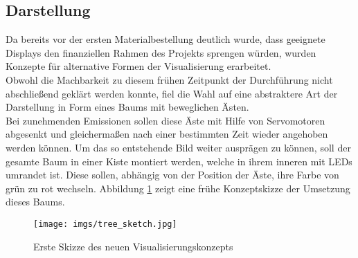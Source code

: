 \documentclass[.../Dokumentation.tex]{subfiles}
\begin{document}
\subsection{Darstellung}\label{sec-ita1-visualization}
Da bereits vor der ersten Materialbestellung deutlich wurde, 
dass geeignete Displays den finanziellen Rahmen des Projekts sprengen 
würden, wurden Konzepte für alternative Formen der Visualisierung erarbeitet.\\
Obwohl die Machbarkeit zu diesem frühen Zeitpunkt der Durchführung nicht 
abschließend geklärt werden konnte, fiel die Wahl auf eine abstraktere Art 
der Darstellung in Form eines Baums mit beweglichen Ästen.\\
Bei zunehmenden Emissionen sollen diese Äste mit Hilfe von 
Servomotoren abgesenkt und gleichermaßen nach einer bestimmten Zeit wieder 
angehoben werden können. Um das so entstehende Bild weiter ausprägen zu können, 
soll der gesamte Baum in einer Kiste montiert werden, welche in ihrem inneren 
mit LEDs umrandet ist. Diese sollen, abhängig von der Position der Äste, 
ihre Farbe von grün zu rot wechseln.
Abbildung \ref{fig-tree-sketch} zeigt eine frühe Konzeptskizze der Umsetzung 
dieses Baums.
\begin{figure}[H]
    \begin{center}
    \texttt{[image: imgs/tree\_sketch.jpg]}
    \caption{Erste Skizze des neuen Visualisierungskonzepts}
    \label{fig-tree-sketch}
    \end{center}
\end{figure}
\end{document}
